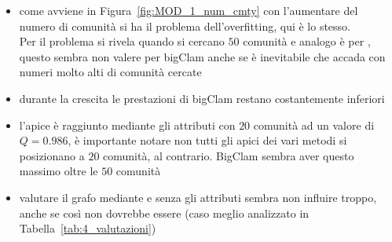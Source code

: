 \begin{itemize}
	\item come avviene in Figura~\ref{fig:MOD_1_num_cmty} con l'aumentare del numero di comunità si ha il problema dell'overfitting, qui è lo stesso.\\
	Per \citeseer il problema si rivela quando si cercano $50$ comunità e analogo è per \cora, questo sembra non valere per bigClam anche se è inevitabile che accada con numeri molto alti di comunità cercate
	\item durante la crescita le prestazioni di bigClam restano costantemente inferiori
	\item l'apice è raggiunto mediante gli attributi con $20$ comunità ad un valore di $Q=0.986$, è importante notare non tutti gli apici dei vari metodi si posizionano a $20$ comunità, al contrario. BigClam sembra aver questo massimo oltre le $50$ comunità
	\item valutare il grafo mediante e senza gli attributi sembra non influire troppo, anche se così non dovrebbe essere (caso meglio analizzato in Tabella~\ref{tab:4_valutazioni})
\end{itemize}
%
